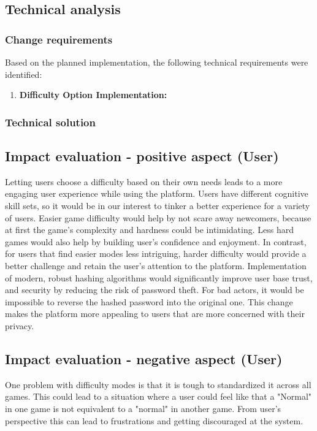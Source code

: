 \documentclass[11pt,a4paper]{article}
\begin{document}
\begin{comment}
    kaip ir done????
\end{comment}

\subsection{Technical analysis}
\subsubsection{Change requirements}
Based on the planned implementation, the following technical requirements were identified:

\begin{enumerate}
    \item  \textbf{Difficulty Option Implementation:}
    \begin{itemize}
        
    \end{itemize}
\end{enumerate}
\subsubsection{Technical solution}

\subsection{Impact evaluation - positive aspect (User)}
Letting users choose a difficulty based on their own needs leads to a more engaging user experience while using the platform. Users have different cognitive skill sets, so it would be in our interest to tinker a better experience for a variety of users. Easier game difficulty would help by not scare away newcomers, because at first the game's complexity and hardness could be intimidating. Less hard games would also help by building user's confidence and enjoyment. In contrast, for users that find easier modes less intriguing, harder difficulty would provide a better challenge and retain the user's attention to the platform.
Implementation of modern, robust hashing algorithms would significantly improve user base trust, and security by reducing the risk of password theft. For bad actors, it would be impossible to reverse the hashed password into the original one. This change makes the platform more appealing to users that are more concerned with their privacy.

\subsection{Impact evaluation - negative aspect (User)}
One problem with difficulty modes is that it is tough to standardized it across all games. This could lead to a situation where a user could feel like that a "Normal" in one game is not equivalent to a "normal" in another game. From user's perspective this can lead to frustrations and getting discouraged at the system.
\end{document}
